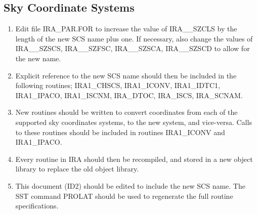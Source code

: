 \subsection {Sky Coordinate Systems}
\begin {enumerate}

\item Edit file IRA\_PAR.FOR to increase the value of IRA\_\_SZCLS by the 
length of the new SCS name plus one. If necessary, also change the values of
IRA\_\_SZSCS, IRA\_\_SZFSC, IRA\_\_SZSCA, IRA\_\_SZSCD to allow for the new
name. 

\item Explicit reference to the new SCS name should then be included in the
following routines; IRA1\_CHSCS, IRA1\_ICONV, IRA1\_IDTC1, IRA1\_IPACO, 
IRA1\_ISCNM, IRA\_DTOC, IRA\_ISCS, IRA\_SCNAM.

\item New routines should be written to convert coordinates from each of the 
supported sky coordinates systems, to the new system, and vice-versa. Calls
to these routines should be included in routines IRA1\_ICONV and IRA1\_IPACO.

\item Every routine in IRA should then be recompiled, and stored in a new object
library to replace the old object library. 

\item This document (ID2) should be edited to include the new SCS name. The
SST command PROLAT should be used to regenerate the full routine specifications.

\end {enumerate}

